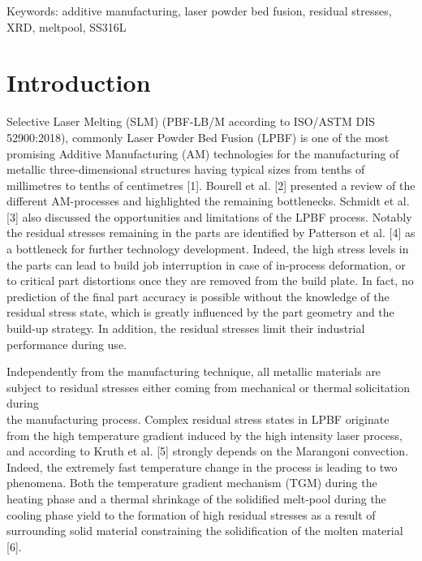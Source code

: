 \documentclass[10pt]{article}
\begin{document}
Keywords: additive manufacturing, laser powder bed fusion, residual stresses, XRD, meltpool, SS316L

\section*{Introduction}
Selective Laser Melting (SLM) (PBF-LB/M according to ISO/ASTM DIS 52900:2018), commonly Laser Powder Bed Fusion (LPBF) is one of the most promising Additive Manufacturing (AM) technologies for the manufacturing of metallic three-dimensional structures having typical sizes from tenths of millimetres to tenths of centimetres [1]. Bourell et al. [2] presented a review of the different AM-processes and highlighted the remaining bottlenecks. Schmidt et al. [3] also discussed the opportunities and limitations of the LPBF process. Notably the residual stresses remaining in the parts are identified by Patterson et al. [4] as a bottleneck for further technology development. Indeed, the high stress levels in the parts can lead to build job interruption in case of in-process deformation, or to critical part distortions once they are removed from the build plate. In fact, no prediction of the final part accuracy is possible without the knowledge of the residual stress state, which is greatly influenced by the part geometry and the build-up strategy. In addition, the residual stresses limit their industrial performance during use.

Independently from the manufacturing technique, all metallic materials are subject to residual stresses either coming from mechanical or thermal solicitation during\\
the manufacturing process. Complex residual stress states in LPBF originate from the high temperature gradient induced by the high intensity laser process, and according to Kruth et al. [5] strongly depends on the Marangoni convection. Indeed, the extremely fast temperature change in the process is leading to two phenomena. Both the temperature gradient mechanism (TGM) during the heating phase and a thermal shrinkage of the solidified melt-pool during the cooling phase yield to the formation of high residual stresses as a result of surrounding solid material constraining the solidification of the molten material [6].
\end{document}
